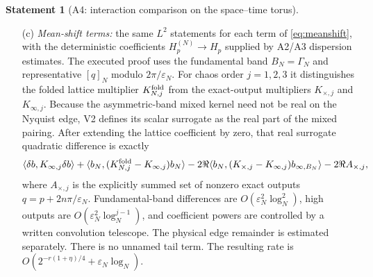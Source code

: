 \documentclass[11pt,a4paper]{article}
\theoremstyle{plain}
\theoremstyle{definition}
\newtheorem{statement}[theorem]{Statement}
\newcommand{\eps}{\varepsilon}
\begin{document}
\begin{statement}[A4: interaction comparison on the space--time torus]
\begin{enumerate}
\emph{Superseded (12 Aug 2026):} the executed form of this clause is V2,
Corollary 5.2, and its outcome is that \emph{no} residue survives: the lattice and
continuum fields' equal-point variances also differ by exactly $\delta_\infty$, which
cancels the excess Wick subtraction, so the gate's continuum polynomial is plain
$\varphi^4$ and the endpoint convention is $(a,b)=(0,0)$. $\delta_\infty$ remains the
correctly computed offset between the two tadpoles. \emph{Task (as executed):}
compute $\delta_\infty$ exactly (mode sums; the model sheet's
$c_N=\tfrac1{2\pi}\log\tfrac8{m\eps_N}+o(1)$ already fixes the divergent part), and
\emph{define} $\omega^{\rm ct}_{L,\lambda}$ in Definition~\ref{def:gate} as the vacuum
of the so-normalized continuum polynomial. This is a convention lock, exactly parallel
to Part I's Remark on sharp-time Wick ordering; (II.11) without it is
under-specified.
\item[\rm(c)] \emph{Mean-shift terms:} the same $L^2$ statements for each term of
\eqref{eq:meanshift}, with the deterministic coefficients $H^{(N)}_p\to H_p$ supplied
by A2/A3 dispersion estimates.  The executed proof uses the fundamental band
$B_N=\Gamma_N$ and representative $[q]_N$ modulo $2\pi/\eps_N$.  For chaos order
$j=1,2,3$ it distinguishes the folded lattice multiplier
$K_{N,j}^{\rm fold}$ from the exact-output multipliers $K_{\times,j}$ and
$K_{\infty,j}$.  Because the asymmetric-band mixed kernel need not be real on
the Nyquist edge, V2 defines its scalar surrogate as the real part of the mixed
pairing.  After extending the lattice coefficient by zero, that real surrogate
quadratic difference is exactly
\[
 \langle\delta b,K_{\infty,j}\delta b\rangle
 +\langle b_N,(K_{N,j}^{\rm fold}-K_{\infty,j})b_N\rangle
 -2\Re\langle b_N,(K_{\times,j}-K_{\infty,j})b_{\infty,B_N}\rangle
 -2\Re A_{\times,j},
\]
where $A_{\times,j}$ is the explicitly summed set of nonzero exact outputs
$q=p+2n\pi/\eps_N$.  Fundamental-band differences are
$O(\eps_N^2\log_N^2)$, high outputs are
$O(\eps_N^2\log_N^{j-1})$, and coefficient powers are controlled by a written
convolution telescope.  The physical edge remainder is estimated separately.
There is no unnamed tail term.  The resulting rate is
$O(2^{-r(1+\eta)/4}+\eps_N\log_N)$.
\end{enumerate}


\end{statement}
\end{document}
